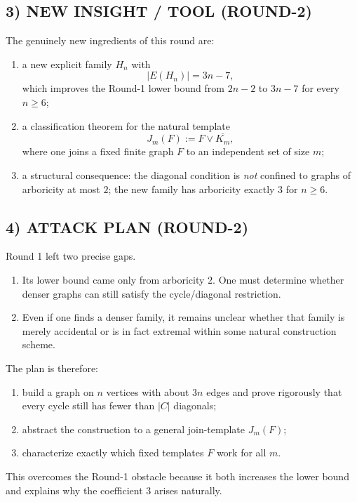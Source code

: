 \subsection*{3) NEW INSIGHT / TOOL (ROUND-2)}
The genuinely new ingredients of this round are:

\begin{enumerate}
\item a new explicit family $H_n$ with
\[
|E(H_n)|=3n-7,
\]
which improves the Round-1 lower bound from $2n-2$ to $3n-7$ for every $n\ge 6$;
\item a classification theorem for the natural template
\[
J_m(F):=F\vee \overline{K_m},
\]
where one joins a fixed finite graph $F$ to an independent set of size $m$;
\item a structural consequence: the diagonal condition is \emph{not} confined to graphs of arboricity at most $2$; the new family has arboricity exactly $3$ for $n\ge 6$.
\end{enumerate}

\subsection*{4) ATTACK PLAN (ROUND-2)}
Round 1 left two precise gaps.

\begin{enumerate}
\item Its lower bound came only from arboricity $2$. One must determine whether denser graphs can still satisfy the cycle/diagonal restriction.
\item Even if one finds a denser family, it remains unclear whether that family is merely accidental or is in fact extremal within some natural construction scheme.
\end{enumerate}

The plan is therefore:

\begin{enumerate}
\item build a graph on $n$ vertices with about $3n$ edges and prove rigorously that every cycle still has fewer than $|C|$ diagonals;
\item abstract the construction to a general join-template $J_m(F)$;
\item characterize exactly which fixed templates $F$ work for all $m$.
\end{enumerate}

This overcomes the Round-1 obstacle because it both increases the lower bound and explains why the coefficient $3$ arises naturally.

